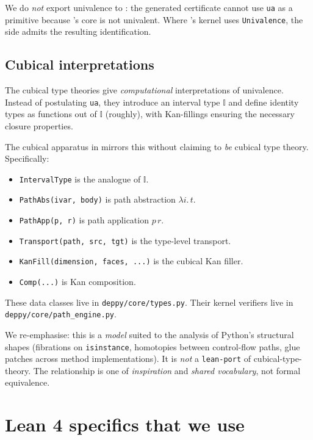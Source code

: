 We do \emph{not} export univalence to \Lean: the generated
certificate cannot use \texttt{ua} as a primitive because \Lean{}'s
core is not univalent.  Where \Deppy's kernel uses
\texttt{Univalence}, the \Lean{} side admits the resulting
identification.

\subsection{Cubical interpretations}

The cubical type theories \citep{CCHM, ABCFHL} give
\emph{computational} interpretations of univalence.  Instead of
postulating \texttt{ua}, they introduce an interval type $\mathbb{I}$
and define identity types as functions out of $\mathbb{I}$
(roughly), with Kan-fillings ensuring the necessary closure
properties.

The cubical apparatus in \Deppy{} mirrors this without claiming
to \emph{be} cubical type theory.  Specifically:
\begin{itemize}[leftmargin=1.7em]
  \item \verb|IntervalType| is the \Deppy{} analogue of $\mathbb{I}$.
  \item \verb|PathAbs(ivar, body)| is path abstraction
    $\lambda i.\, t$.
  \item \verb|PathApp(p, r)| is path application $p\,r$.
  \item \verb|Transport(path, src, tgt)| is the type-level transport.
  \item \verb|KanFill(dimension, faces, ...)| is the cubical Kan filler.
  \item \verb|Comp(...)| is Kan composition.
\end{itemize}
These data classes live in \verb|deppy/core/types.py|.  Their kernel
verifiers live in \verb|deppy/core/path_engine.py|.

We re-emphasise: this is a \emph{model} suited to the analysis of
Python's structural shapes (fibrations on \texttt{isinstance},
homotopies between control-flow paths, glue patches across method
implementations).  It is \emph{not} a \texttt{lean-port} of
cubical-type-theory.  The relationship is one of \emph{inspiration}
and \emph{shared vocabulary}, not formal equivalence.

\section{Lean 4 specifics that we use}
\label{sec:lean4-specifics}

